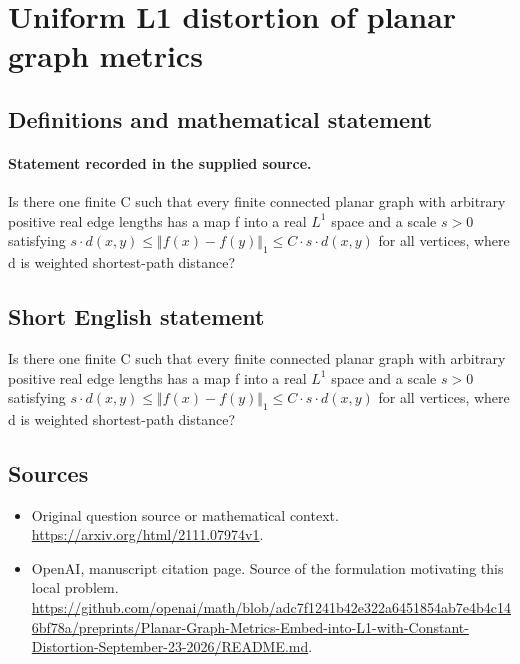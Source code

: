 \documentclass[11pt]{article}
\begin{document}
\section*{Uniform L1 distortion of planar graph metrics}\label{statement}
\subsection{Definitions and mathematical statement}
\paragraph{Statement recorded in the supplied source.}
Is there one finite C such that every finite connected planar graph with arbitrary positive real edge lengths has a map f into a real $L^{1}$ space and a scale $s>0$ satisfying $s\cdot d(x,y)\leq \Vert f(x)-f(y)\Vert _{1}\leq C\cdot s\cdot d(x,y)$ for all vertices, where d is weighted shortest-path distance?
\subsection{Short English statement}
Is there one finite C such that every finite connected planar graph with arbitrary positive real edge lengths has a map f into a real $L^{1}$ space and a scale $s>0$ satisfying $s\cdot d(x,y)\leq \Vert f(x)-f(y)\Vert _{1}\leq C\cdot s\cdot d(x,y)$ for all vertices, where d is weighted shortest-path distance?
\subsection{Sources}
\begin{itemize}
\item[S1] Original question source or mathematical context.
\url{https://arxiv.org/html/2111.07974v1}.
\item[S2] OpenAI, manuscript citation page. Source of the formulation motivating this local problem.
\url{https://github.com/openai/math/blob/adc7f1241b42e322a6451854ab7e4b4c146bf78a/preprints/Planar-Graph-Metrics-Embed-into-L1-with-Constant-Distortion-September-23-2026/README.md}.
\end{itemize}
\end{document}
